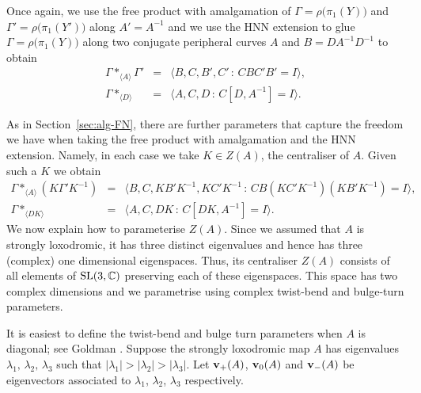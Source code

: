 \documentclass[11pt]{amsart}
\numberwithin{equation}{section}
\begin{document}
Once again, we use the free product with amalgamation of $\Gamma=\rho\bigl(\pi_1(Y)\bigr)$ and 
$\Gamma'=\rho\bigl(\pi_1(Y')\bigr)$ along $A'=A^{-1}$ and we use the HNN extension to glue 
$\Gamma=\rho\bigl(\pi_1(Y)\bigr)$ along two conjugate peripheral curves $A$ and $B=DA^{-1}D^{-1}$ to obtain
\begin{eqnarray*}
\Gamma *_{\langle A\rangle} \Gamma' & = & \langle B,C,B',C'\,:\, CBC'B'=I\rangle, \\
\Gamma *_{\langle D\rangle} & = & \langle A,C,D\,:\,C[D,A^{-1}]=I\rangle.
\end{eqnarray*}

As in Section~\ref{sec:alg-FN}, there are further parameters that capture the freedom we have when 
taking the free product with amalgamation and the HNN extension. Namely, in each case we take $K\in Z(A)$, the
centraliser of $A$. Given such a $K$ we obtain
\begin{eqnarray*}
\Gamma *_{\langle A\rangle} (K\Gamma'K^{-1}) & = & \langle B,C,KB'K^{-1},KC'K^{-1}\,:\, CB(KC'K^{-1})(KB'K^{-1})=I\rangle, \\
\Gamma *_{\langle DK\rangle} & = & \langle A,C,DK\,:\,C[DK,A^{-1}]=I\rangle.
\end{eqnarray*}
We now explain how to parameterise $Z(A)$.
Since we assumed that $A$ is strongly loxodromic, it has three distinct eigenvalues and hence has three
(complex) one dimensional eigenspaces. Thus, its centraliser $Z(A)$ consists of all elements of ${\rm SL}(3,{\mathbb C})$ 
preserving each of these eigenspaces. This space has two complex dimensions and we parametrise using complex
twist-bend and bulge-turn parameters.

It is easiest to define the twist-bend and bulge turn parameters when $A$ is diagonal; see Goldman \cite{Gol}.
Suppose the strongly loxodromic map $A$ has eigenvalues $\lambda_1,\,\lambda_2,\,\lambda_3$ such that 
$|\lambda_1|> |\lambda_2|> |\lambda_3|$.  Let ${\bf v}_+(A)$, ${\bf v}_0(A)$ and ${\bf v}_-(A)$ be eigenvectors
associated to $\lambda_1$, $\lambda_2$, $\lambda_3$ respectively. 
\end{document}
